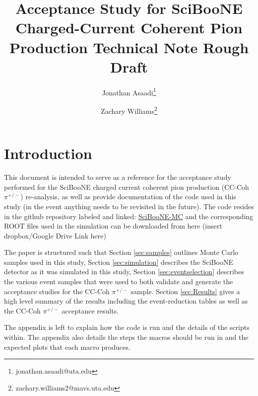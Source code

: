 \documentclass[11pt]{article}
\title{Acceptance Study for SciBooNE Charged-Current Coherent Pion Production Technical Note Rough Draft}
\author[1]{Jonathan Asaadi\thanks{jonathan.asaadi@uta.edu}}
\author[1]{Zachary Williams\thanks{zachary.williams2@mavs.uta.edu}}
\affil[1]{Department of Physics, The University of Texas at Arlington}
\begin{document}
\begin{minipage}[h]{\textwidth}
\maketitle


\end{minipage}



\section{Introduction}\label{sec:introduction}
This document is intended to serve as a reference for the acceptance study performed for the SciBooNE charged current coherent pion production (CC-Coh $\pi^{+/-}$) re-analysis, as well as provide documentation of the code used in this study (in the event anything needs to be revisited in the future). The code resides in the github repository labeled and linked: \href{https://github.com/williamszg/SciBooNE-MC}{SciBooNE-MC} and the corresponding ROOT files used in the simulation can be downloaded from here (insert dropbox/Google Drive Link here)

The paper is structured such that Section \ref*{sec:samples} outlines Monte Carlo samples used in this study, Section \ref*{sec:simulation} describes the SciBooNE detector as it was simulated in this study, Section \ref*{sec:eventselection} describes the various event samples that were used to both validate and generate the acceptance studies for the CC-Coh $\pi^{+/-}$ sample. Section \ref*{sec:Results} gives a high level summary of the results including the event-reduction tables as well as the CC-Coh $\pi^{+/-}$ acceptance results. %

The appendix is left to explain how the code is run and the details of the scripts within. The appendix also details the steps the macros should be run in and the expected plots that each macro produces.
\end{document}
